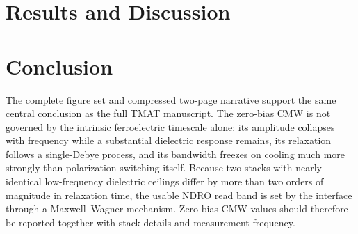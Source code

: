 \documentclass[conference]{IEEEtran}
\begin{document}
\section{Results and Discussion}


\section{Conclusion}
The complete figure set and compressed two-page narrative support the same central conclusion as the full TMAT manuscript. The zero-bias CMW is not governed by the intrinsic ferroelectric timescale alone: its amplitude collapses with frequency while a substantial dielectric response remains, its relaxation follows a single-Debye process, and its bandwidth freezes on cooling much more strongly than polarization switching itself. Because two stacks with nearly identical low-frequency dielectric ceilings differ by more than two orders of magnitude in relaxation time, the usable NDRO read band is set by the interface through a Maxwell--Wagner mechanism. Zero-bias CMW values should therefore be reported together with stack details and measurement frequency.




\clearpage

\end{document}
